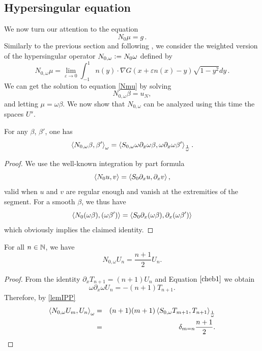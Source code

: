 \documentclass[a4paper]{subfiles}
\begin{document}
\subsection{Hypersingular equation} 

We now turn our attention to the equation 
\begin{equation}
N_0\mu = g\,.
\label{Nmu}
\end{equation} 
\noindent Similarly to the previous section and following \cite{bruno2012second}, we consider the weighted version of the hypersingular operator $N_{0,\omega} \mathrel{\mathop:}= N_0 \omega$ defined by
\[N_{0,\omega} \mu = \lim_{\varepsilon\to 0}\int_{-1}^{1} n(y)\cdot\nabla G(x + \varepsilon n(x) - y) \sqrt{1-y^2} dy\,.\]
We can get the solution to equation \eqref{Nmu} by solving 
\begin{equation}
	N_{0,\omega} \beta = u_N,
	\label{Nomegabeta}
\end{equation}
and letting $\mu = \omega \beta$. 
We now show that $N_{0,\omega}$ can be analyzed using this time the spaces $U^s$. 
\begin{lemma}
	\label{lemIPP}
	For any $\beta$, $\beta'$, one has 
	\[\left\langle N_{0,\omega} \beta, \beta'\right\rangle_\omega = \left\langle S_{0,\omega} \omega \partial_x \omega \beta,\omega \partial_x \omega \beta'\right\rangle_\frac{1}{\omega}.\]
	\begin{proof}
		 We use the well-known integration by part formula
		\[\left\langle N_0 u,v\right\rangle = \left\langle S_0\partial_x u,\partial_x v\right\rangle,\]
		valid when $u$ and $v$ are regular enough and vanish at the extremities of the segment. 
		For a smooth $\beta$, we thus have
		\[ \left\langle N_0 (\omega \beta), (\omega \beta')\right\rangle = \left\langle S_0 \partial_x(\omega \beta),\partial_x (\omega \beta')\right\rangle\] 
		which obviously implies the claimed identity. 
	\end{proof}
\end{lemma}
\begin{lemma}
	For all $n \in \mathbb{N}$, we have 
	\[N_{0,\omega} U_n = \frac{n+1}{2}U_n.\]	
	\label{NUn}
\end{lemma}
\begin{proof}
	From the identity $\partial_x T_{n+1} = (n+1)U_n$ and Equation $\eqref{cheb1}$ we obtain
	\begin{equation*}
	\omega \partial_x \omega U_n = -(n+1) T_{n+1}.
	\end{equation*}
	Therefore, by \autoref{lemIPP}
	\begin{eqnarray}
		\left\langle N_{0,\omega} U_m,U_n\right\rangle_\omega & = & (n+1)(m+1)\left\langle S_{0,\omega} T_{m+1},T_{n+1}\right\rangle_\frac{1}{\omega}\nonumber\\
		&=& \delta_{m=n} \frac{n+1}{2}.
		\label{NomUmUn}	
	\end{eqnarray}
\end{proof}
\end{document}
